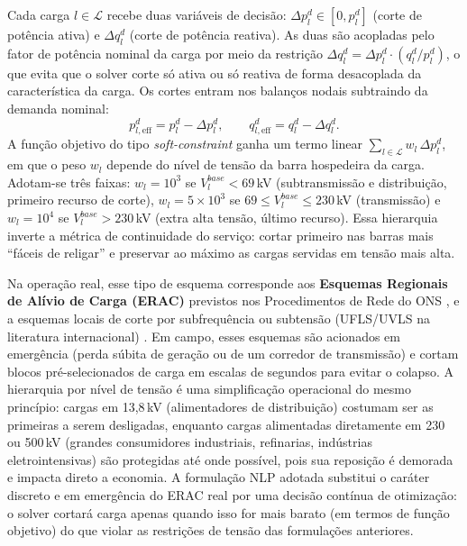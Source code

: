 Cada carga $l \in \mathcal{L}$ recebe duas variáveis de decisão: $\Delta p^d_l \in [0, p^d_l]$ (corte de potência ativa) e $\Delta q^d_l$ (corte de potência reativa). As duas são acopladas pelo fator de potência nominal da carga por meio da restrição $\Delta q^d_l = \Delta p^d_l \cdot (q^d_l / p^d_l)$, o que evita que o solver corte só ativa ou só reativa de forma desacoplada da característica da carga. Os cortes entram nos balanços nodais subtraindo da demanda nominal:
\begin{equation}
\label{eq:dera-balanco}
p^d_{l,\text{eff}} = p^d_l - \Delta p^d_l, \qquad q^d_{l,\text{eff}} = q^d_l - \Delta q^d_l.
\end{equation}
A função objetivo do tipo \textit{soft-constraint} ganha um termo linear $\sum_{l \in \mathcal{L}} w_l \, \Delta p^d_l$, em que o peso $w_l$ depende do nível de tensão da barra hospedeira da carga. Adotam-se três faixas: $w_l = 10^3$ se $V^{base}_l < 69$\,kV (subtransmissão e distribuição, primeiro recurso de corte), $w_l = 5{\times}10^3$ se $69 \le V^{base}_l \le 230$\,kV (transmissão) e $w_l = 10^4$ se $V^{base}_l > 230$\,kV (extra alta tensão, último recurso). Essa hierarquia inverte a métrica de continuidade do serviço: cortar primeiro nas barras mais ``fáceis de religar'' e preservar ao máximo as cargas servidas em tensão mais alta.

Na operação real, esse tipo de esquema corresponde aos \textbf{Esquemas Regionais de Alívio de Carga (ERAC)} previstos nos Procedimentos de Rede do ONS \cite{ons2025sm12}, e a esquemas locais de corte por subfrequência ou subtensão (UFLS/UVLS na literatura internacional) \cite{taylor1994voltage}. Em campo, esses esquemas são acionados em emergência (perda súbita de geração ou de um corredor de transmissão) e cortam blocos pré-selecionados de carga em escalas de segundos para evitar o colapso. A hierarquia por nível de tensão é uma simplificação operacional do mesmo princípio: cargas em 13,8\,kV (alimentadores de distribuição) costumam ser as primeiras a serem desligadas, enquanto cargas alimentadas diretamente em 230 ou 500\,kV (grandes consumidores industriais, refinarias, indústrias eletrointensivas) são protegidas até onde possível, pois sua reposição é demorada e impacta direto a economia. A formulação NLP adotada substitui o caráter discreto e em emergência do ERAC real por uma decisão contínua de otimização: o solver cortará carga apenas quando isso for mais barato (em termos de função objetivo) do que violar as restrições de tensão das formulações anteriores.


